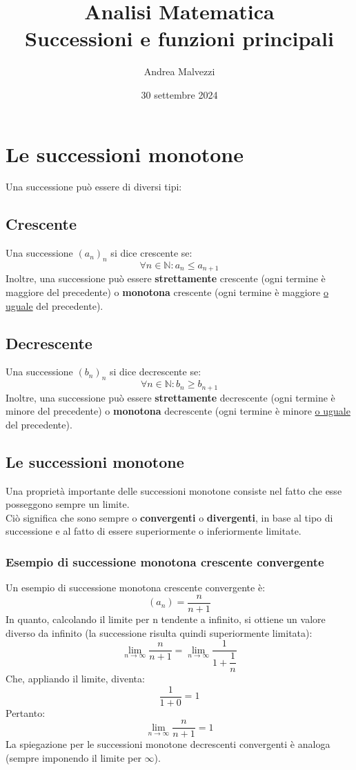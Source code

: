 \documentclass[12pt]{article}
\title{\textbf{Analisi Matematica\\Successioni e funzioni principali}}
\date{30 settembre 2024}
\author{Andrea Malvezzi}
\begin{document}
\maketitle
\pagebreak
\tableofcontents
\pagebreak
\section{Le successioni monotone}
Una successione può essere di diversi tipi:
\subsection{Crescente}
Una successione $(a_n)_n$ si dice crescente se:
\begin{equation}
    \forall n \in \mathbb{N}: a_n \leq a_{n+1} \label{eq:successione_crescente}
\end{equation}
Inoltre, una successione può essere \textbf{strettamente} crescente (ogni termine è maggiore del precedente) o \textbf{monotona} crescente (ogni termine è maggiore \underline{o uguale} del precedente).
\subsection{Decrescente}
Una successione $(b_n)_n$ si dice decrescente se:
\begin{equation}
    \forall n \in \mathbb{N}: b_n \geq b_{n+1} \label{eq:successione_decrescente}
\end{equation}
Inoltre, una successione può essere \textbf{strettamente} decrescente (ogni termine è minore del precedente) o \textbf{monotona} decrescente (ogni termine è minore \underline{o uguale} del precedente).
\subsection{Le successioni monotone}
Una proprietà importante delle successioni monotone consiste nel fatto che esse posseggono sempre un limite.\\
Ciò significa che sono sempre o \textbf{convergenti} o \textbf{divergenti}, in base al tipo di successione e al fatto di essere superiormente o inferiormente limitate.
\pagebreak
\subsubsection{Esempio di successione monotona crescente convergente}
Un esempio di successione monotona crescente convergente è:
\[
    (a_n) = \dfrac{n}{n+1}
\]
In quanto, calcolando il limite per n tendente a infinito, si ottiene un valore diverso da infinito (la successione risulta quindi superiormente limitata):
\[
    \lim_{n\to\infty} \dfrac{n}{n+1} = \lim_{n\to\infty} \dfrac{1}{1 + \dfrac{1}{n}}
\]
Che, appliando il limite, diventa:
\[
    \dfrac{1}{1 + 0} = 1
\]
Pertanto:
\[
    \lim_{n\to\infty} \dfrac{n}{n+1} = 1
\]
La spiegazione per le successioni monotone decrescenti convergenti è analoga (sempre imponendo il limite per $\infty$).
\end{document}

